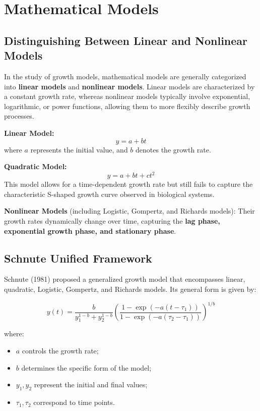 \documentclass{article}
\begin{document}
\section{Mathematical Models}

\subsection{Distinguishing Between Linear and Nonlinear Models}

In the study of growth models, mathematical models are generally categorized into \textbf{linear models} and \textbf{nonlinear models}. Linear models are characterized by a constant growth rate, whereas nonlinear models typically involve exponential, logarithmic, or power functions, allowing them to more flexibly describe growth processes.

\textbf{Linear Model:}
\begin{equation}
  y = a + bt
\end{equation}
where \( a \) represents the initial value, and \( b \) denotes the growth rate.

\textbf{Quadratic Model:}
\begin{equation}
  y = a + bt + ct^2
\end{equation}
This model allows for a time-dependent growth rate but still fails to capture the characteristic S-shaped growth curve observed in biological systems.

\textbf{Nonlinear Models} (including Logistic, Gompertz, and Richards models):
Their growth rates dynamically change over time, capturing the \textbf{lag phase, exponential growth phase, and stationary phase}.

\subsection{Schnute Unified Framework}

Schnute (1981) proposed a generalized growth model that encompasses linear, quadratic, Logistic, Gompertz, and Richards models. Its general form is given by:

\begin{equation}
  y(t) = \frac{b}{y_1^{1-b} + y_2^{1-b}} \left( \frac{1 - \exp(-a(t - \tau_1))}{1 - \exp(-a(\tau_2 - \tau_1))} \right)^{1/b}
\end{equation}

where:
\begin{itemize}
    \item \( a \) controls the growth rate;
    \item \( b \) determines the specific form of the model;
    \item \( y_1, y_2 \) represent the initial and final values;
    \item \( \tau_1, \tau_2 \) correspond to time points.
\end{itemize}
\end{document}
